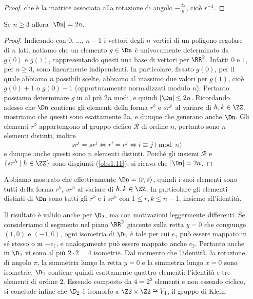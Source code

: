 \documentclass[11pt]{scrartcl}
\begin{document}
\begin{proof}
		che è la matrice associata alla rotazione di angolo $-
		\frac{2\pi}{n}$, cioè $r^{-1}$.
	\end{proof}
	
	\begin{proposition}
		Se $n \geq 3$ allora $\lvert \Dn \rvert = 2n$.
	\end{proposition}
	
	\begin{proof}
		Indicando con $0$, ..., $n-1$ i vettori degli $n$ vertici di un poligono regolare di $n$ lati, notiamo
		che un elemento $g \in \Dn$ è univocamente determinato da $g(0)$ e $g(1)$, rappresentando
		questi una base di vettori per $\RR^2$. Infatti $0$ e $1$, per $n \geq 3$, sono
		linearmente indipendenti.
		In particolare, fissato $g(0)$, per il quale abbiamo $n$ possibili scelte,
		abbiamo al massimo due valori per $g(1)$, cioè $g(0) + 1$ o $g(0) - 1$ (opportunamente
		normalizzati modulo $n$). Pertanto possiamo determinare $g$ in al più $2n$ modi, e quindi 
		$\lvert \Dn \rvert \leq 2n$. Ricordando adesso che $\Dn$ contiene gli elementi
		della forma $r^k$ e $sr^h$ al variare di $h, k \in \ZZ$, mostriamo che questi sono 
		esattamente $2n$, e dunque che generano anche $\Dn$. Gli elementi $r^k$ appartengono al gruppo ciclico $\mathcal{R}$
		di ordine $n$, pertanto sono $n$ elementi distinti, inoltre 
		\[
		sr^i = sr^j \iff r^i = r^j\iff i \equiv j \pmod n
		\] e dunque anche questi sono $n$
		elementi distinti. Poiché gli insiemi $\mathcal{R}$ e 
		$\{sr^h\mid h \in \ZZ\}$ sono disgiunti (\autoref{obs1.11}), 
		si ricava che $\lvert \Dn \rvert = 2n$.
	\end{proof}
	
	\begin{remark}
		Abbiamo mostrato che effettivamente $\Dn = \langle r, s\rangle$, quindi i
		suoi elementi sono tutti della forma $r^k$, $sr^h$ al variare di $h, k \in \ZZ$. In
		particolare gli elementi distinti di $\Dn$ sono tutti gli $r^k$ e i $sr^h$ con
		$1 \leq r, k \leq n-1$, insieme all'identità.
	\end{remark}
	
	\begin{remark}
		Il risultato è valido anche per $\D_2$, ma con motivazioni leggermente differenti. 
		Se consideriamo il segmento nel piano $\RR^2$ giacente sulla retta $y = 0$ che
		congiunge $(1, 0)$ e $(-1, 0)$, ogni isometria di $\D_2$ è tale per cui
		$e_1$ può essere mappato in sé stesso o in $-e_1$, e analogamente può essere
		mappato anche $e_2$. Pertanto anche in $\D_2$ vi sono al più $2 \cdot 2 = 4$
		isometrie. Dal momento che l'identità, la rotazione di 
		angolo $\pi$, la simmetria lungo la retta $y = 0$ e la simmetria lungo $x=0$ sono
		isometrie,
		$\D_2$ contiene quindi esattamente quattro elementi:
		l'identità e tre elementi di ordine $2$. Essendo composto da $4 = 2^2$ elementi
		e non essendo ciclico, si conclude infine che
		$\D_2$ è isomorfo a $\Z2\times\Z2 \cong V_4$,
		il gruppo di Klein.
	\end{remark}
	
\end{document}
